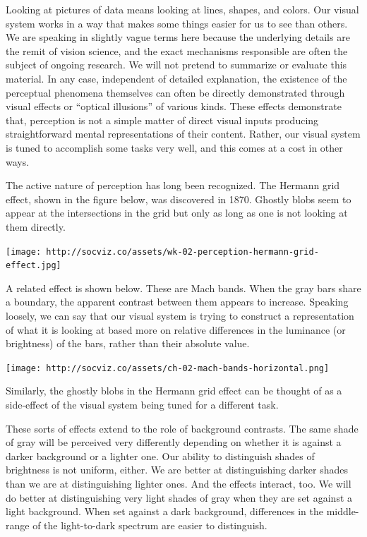 \documentclass[
]{book}
\begin{document}
Looking at pictures of data means looking at lines, shapes, and colors. Our visual system works in a way that makes some things easier for us to see than others. We are speaking in slightly vague terms here because the underlying details are the remit of vision science, and the exact mechanisms responsible are often the subject of ongoing research. We will not pretend to summarize or evaluate this material. In any case, independent of detailed explanation, the existence of the perceptual phenomena themselves can often be directly demonstrated through visual effects or ``optical illusions'' of various kinds. These effects demonstrate that, perception is not a simple matter of direct visual inputs producing straightforward mental representations of their content. Rather, our visual system is tuned to accomplish some tasks very well, and this comes at a cost in other ways.

The active nature of perception has long been recognized. The Hermann grid effect, shown in the figure below, was discovered in 1870. Ghostly blobs seem to appear at the intersections in the grid but only as long as one is not looking at them directly.

\texttt{[image: http://socviz.co/assets/wk-02-perception-hermann-grid-effect.jpg]}

A related effect is shown below. These are Mach bands. When the gray bars share a boundary, the apparent contrast between them appears to increase. Speaking loosely, we can say that our visual system is trying to construct a representation of what it is looking at based more on relative differences in the luminance (or brightness) of the bars, rather than their absolute value.

\texttt{[image: http://socviz.co/assets/ch-02-mach-bands-horizontal.png]}

Similarly, the ghostly blobs in the Hermann grid effect can be thought of as a side-effect of the visual system being tuned for a different task.

These sorts of effects extend to the role of background contrasts. The same shade of gray will be perceived very differently depending on whether it is against a darker background or a lighter one. Our ability to distinguish shades of brightness is not uniform, either. We are better at distinguishing darker shades than we are at distinguishing lighter ones. And the effects interact, too. We will do better at distinguishing very light shades of gray when they are set against a light background. When set against a dark background, differences in the middle-range of the light-to-dark spectrum are easier to distinguish.
\end{document}
